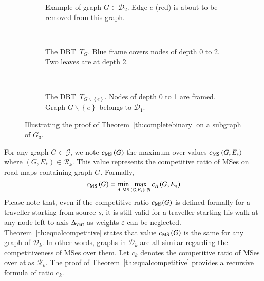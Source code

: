 \documentclass[preprint]{elsarticle}
\newcommand{\set}[1]{\left\{ #1 \right\}}
\newcommand{\mcalg}{\mathcal{G}}
\newcommand{\mcalr}{\mathcal{R}}
\newcommand{\mcald}{\mathcal{D}}
\newcommand{\mts}{MS}
\newcommand{\deltavert}{\Delta_{\mbox{\scriptsize{vert}}}}
\newcommand{\cms}{c_{\mbox{\scriptsize{MS}}}}
\newcommand{\ebt}{DBT}
\begin{document}
\begin{figure}[h]
\centering
\begin{subfigure}[b]{0.3\columnwidth}
\centering
\scalebox{.40}{}
\caption{Example of graph $G \in \mcald_2$. Edge $e$ (red) is about to be removed from this graph.}
\label{subfig:proofth1_a}
\end{subfigure}
~
\begin{subfigure}[b]{0.3\columnwidth}
\centering
\scalebox{.55}{}
\caption{The \ebt ~$T_{G}$. Blue frame covers nodes of depth 0 to 2. Two leaves are at depth 2.}
\label{subfig:proofth1_b}
\end{subfigure}
~
\begin{subfigure}[b]{0.3\columnwidth}
\centering
\scalebox{.55}{}
\caption{The \ebt ~$T_{G \backslash \set{e}}$. Nodes of depth 0 to 1 are framed. Graph $G\backslash \set{e}$ belongs to $\mcald_1$.}
\label{subfig:proofth1_c}
\end{subfigure}
\caption{Illustrating the proof of Theorem~\ref{th:completebinary} on a subgraph of $G_3$.}
\label{fig:proofth1}
\end{figure}


For any graph $G \in \mcalg$, we note $\cms\left(G\right)$ the maximum over values $\cms\left(G,E_*\right)$ where $\left(G,E_*\right) \in \mcalr_k$. This value represents the competitive ratio of \mts es on road maps containing graph $G$. Formally, 
\begin{equation}
\cms\left(G\right) = \min\limits_{A ~\mbox{\scriptsize {MS}}} \max\limits_{\left(G,E_*\right) \in \mcalr} c_A\left(G,E_*\right)
\label{eq:cmsg}
\end{equation}
Please note that, even if the competitive ratio $\cms(G)$ is defined formally for a traveller starting from source $s$, it is still valid for a traveller starting his walk at any node left to axis $\deltavert$ as weights $\varepsilon$ can be neglected. Theorem~\ref{th:equalcompetitive} states that value $\cms\left(G\right)$ is the same for any graph of $\mcald_k$. In other words, graphs in $\mcald_k$ are all similar regarding the competitiveness of \mts es over them. Let $c_k$ denotes the competitive ratio of \mts es over atlas $\mcalr_k$. The proof of Theorem~\ref{th:equalcompetitive} provides a recursive formula of ratio $c_k$.
\end{document}
